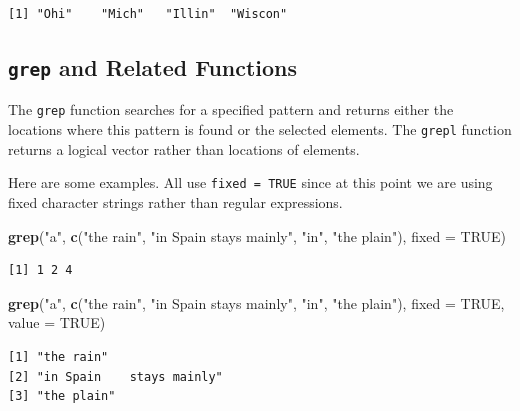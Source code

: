 \documentclass[
]{krantz}
\makeatletter
\newenvironment{Shaded}{\begin{snugshade}}{\end{snugshade}}
\newcommand{\DataTypeTok}[1]{\textcolor[rgb]{0.27,0.27,0.27}{#1}}
\newcommand{\KeywordTok}[1]{\textcolor[rgb]{0.27,0.27,0.27}{\textbf{#1}}}
\newcommand{\NormalTok}[1]{#1}
\newcommand{\OtherTok}[1]{\textcolor[rgb]{0.37,0.37,0.37}{#1}}
\newcommand{\StringTok}[1]{\textcolor[rgb]{0.5,0.5,0.5}{#1}}
\newenvironment{kframe}{%
\medskip{}
\setlength{\fboxsep}{.8em}
 \def\at@end@of@kframe{}%
 \ifinner\ifhmode%
  \def\at@end@of@kframe{\end{minipage}}%
  \begin{minipage}{\columnwidth}%
 \fi\fi%
 \def\FrameCommand##1{\hskip\@totalleftmargin \hskip-\fboxsep
 \colorbox{shadecolor}{##1}\hskip-\fboxsep
     \hskip-\linewidth \hskip-\@totalleftmargin \hskip\columnwidth}%
 \MakeFramed {\advance\hsize-\width
   \@totalleftmargin\z@ \linewidth\hsize
   \@setminipage}}%
 {\par\unskip\endMakeFramed%
 \at@end@of@kframe}
\renewenvironment{Shaded}{\begin{kframe}}{\end{kframe}}
\makeatother
\begin{document}
\begin{verbatim}
[1] "Ohi"    "Mich"   "Illin"  "Wiscon"
\end{verbatim}

\hypertarget{grep-and-related-functions}{%
\subsection{\texorpdfstring{\texttt{grep} and Related Functions}{grep and Related Functions}}\label{grep-and-related-functions}}

The \texttt{grep} function searches for a specified pattern and returns either the locations where this pattern is found or the selected elements. The \texttt{grepl} function returns a logical vector rather than locations of elements.

Here are some examples. All use \texttt{fixed\ =\ TRUE} since at this point we are using fixed character strings rather than regular expressions.

\begin{Shaded}
\begin{Highlighting}[]
\KeywordTok{grep}\NormalTok{(}\StringTok{"a"}\NormalTok{, }\KeywordTok{c}\NormalTok{(}\StringTok{"the rain"}\NormalTok{, }\StringTok{"in Spain    stays mainly"}\NormalTok{, }\StringTok{"in"}\NormalTok{, }\StringTok{"the plain"}\NormalTok{), }
     \DataTypeTok{fixed =} \OtherTok{TRUE}\NormalTok{)}
\end{Highlighting}
\end{Shaded}

\begin{verbatim}
[1] 1 2 4
\end{verbatim}

\begin{Shaded}
\begin{Highlighting}[]
\KeywordTok{grep}\NormalTok{(}\StringTok{"a"}\NormalTok{, }\KeywordTok{c}\NormalTok{(}\StringTok{"the rain"}\NormalTok{, }\StringTok{"in Spain    stays mainly"}\NormalTok{, }\StringTok{"in"}\NormalTok{, }\StringTok{"the plain"}\NormalTok{), }
     \DataTypeTok{fixed =} \OtherTok{TRUE}\NormalTok{, }\DataTypeTok{value =} \OtherTok{TRUE}\NormalTok{)}
\end{Highlighting}
\end{Shaded}

\begin{verbatim}
[1] "the rain"                
[2] "in Spain    stays mainly"
[3] "the plain"               
\end{verbatim}
\end{document}
